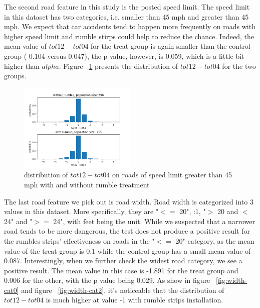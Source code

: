 \documentclass{article}
\begin{document}
The second road feature in this study is the posted speed limit. The speed limit in this dataset has two categories, i.e. smaller than 45 mph and greater than 45 mph. We expect that car accidents tend to happen more frequently on roads with higher speed limit and rumble stirps could help to reduce the chance. Indeed, the mean value of $tot12-tot04$ for the treat group is again smaller than the control group (-0.104 versus 0.047), the p value, however, is 0.059, which is a little bit higher than $alpha$. Figure ~\ref{fig:speed} presents the distribution of $tot12-tot04$ for the two groups.

\begin{figure}[h!]
    \centering
    \includegraphics[width=0.5\textwidth]{with-and-without-rumble-speed-grt45-diff.png}
    \caption{distribution of $tot12-tot04$ on roads of speed limit greater than 45 mph with and without rumble treatment}
    \label{fig:speed}
\end{figure}

The last road feature we pick out is road width. Road width is categorized into 3 values in this dataset. More specifically, they are "$<=$ 20", :1, "$>$ 20 and $<$ 24" and "$>=$ 24", with feet being the unit.  While we suspected that a narrower road tends to be more dangerous, the test does not produce a positive result for the rumbles strips' effectiveness on roads in the "$<=$ 20" category, as the mean value of the treat group is 0.1 while the control group has a small mean value of 0.087. Interestingly, when we further check the widest road category, we see a positive result. The mean value in this case is -1.891 for the treat group and 0.006 for the other, with the p value being 0.029. As show in figure ~\ref{fig:width-cat0} and figure ~\ref{fig:width-cat2}, it's noticeable that the distribution of $tot12-tot04$ is much higher at value -1 with rumble strips installation. 
\end{document}

